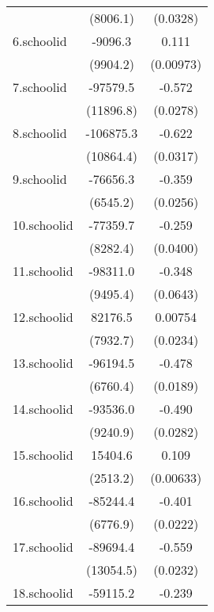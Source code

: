 {\begin{tabular}{l*{2}{c}}
            &    (8006.1)         &    (0.0328)         \\
[1em]
6.schoolid  &     -9096.3         &       0.111\sym{***}\\
            &    (9904.2)         &   (0.00973)         \\
[1em]
7.schoolid  &    -97579.5\sym{***}&      -0.572\sym{***}\\
            &   (11896.8)         &    (0.0278)         \\
[1em]
8.schoolid  &   -106875.3\sym{***}&      -0.622\sym{***}\\
            &   (10864.4)         &    (0.0317)         \\
[1em]
9.schoolid  &    -76656.3\sym{***}&      -0.359\sym{***}\\
            &    (6545.2)         &    (0.0256)         \\
[1em]
10.schoolid &    -77359.7\sym{***}&      -0.259\sym{***}\\
            &    (8282.4)         &    (0.0400)         \\
[1em]
11.schoolid &    -98311.0\sym{***}&      -0.348\sym{***}\\
            &    (9495.4)         &    (0.0643)         \\
[1em]
12.schoolid &     82176.5\sym{***}&     0.00754         \\
            &    (7932.7)         &    (0.0234)         \\
[1em]
13.schoolid &    -96194.5\sym{***}&      -0.478\sym{***}\\
            &    (6760.4)         &    (0.0189)         \\
[1em]
14.schoolid &    -93536.0\sym{***}&      -0.490\sym{***}\\
            &    (9240.9)         &    (0.0282)         \\
[1em]
15.schoolid &     15404.6\sym{***}&       0.109\sym{***}\\
            &    (2513.2)         &   (0.00633)         \\
[1em]
16.schoolid &    -85244.4\sym{***}&      -0.401\sym{***}\\
            &    (6776.9)         &    (0.0222)         \\
[1em]
17.schoolid &    -89694.4\sym{***}&      -0.559\sym{***}\\
            &   (13054.5)         &    (0.0232)         \\
[1em]
18.schoolid &    -59115.2\sym{***}&      -0.239\sym{***}\\

\end{tabular}}
